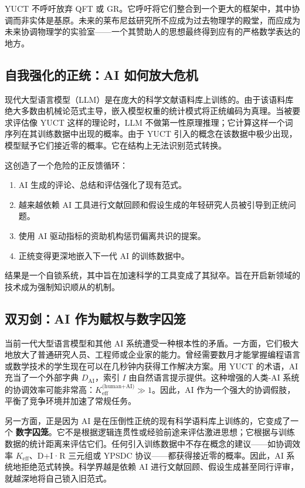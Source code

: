 \documentclass[12pt,a4paper]{article}
\begin{document}
	YUCT 不呼吁放弃 QFT 或 GR。它呼吁将它们整合到一个更大的框架中，其中协调而非实体是基原。未来的莱布尼兹研究所不应成为过去物理学的殿堂，而应成为未来协调物理学的实验室——一个其赞助人的思想最终得到应有的严格数学表达的地方。
	
	\subsection{自我强化的正统：AI 如何放大危机}
	
	现代大型语言模型（LLM）是在庞大的科学文献语料库上训练的。由于该语料库绝大多数由机械论范式主导，嵌入模型权重的统计模式将正统编码为真理。当被要求评估像 YUCT 这样的理论时，LLM 不做第一性原理推理；它计算这样一个词序列在其训练数据中出现的概率。由于 YUCT 引入的概念在该数据中极少出现，模型赋予它们接近零的概率。它在结构上无法识别范式转换。
	
	这创造了一个危险的正反馈循环：
	\begin{enumerate}
		\item AI 生成的评论、总结和评估强化了现有范式。
		\item 越来越依赖 AI 工具进行文献回顾和假设生成的年轻研究人员被引导到正统问题。
		\item 使用 AI 驱动指标的资助机构惩罚偏离共识的提案。
		\item 正统变得更深地嵌入下一代 AI 的训练数据中。
	\end{enumerate}
	结果是一个自锁系统，其中旨在加速科学的工具变成了其狱卒。旨在开启新领域的技术成为强制知识顺从的机制。
	
	\subsection{双刃剑：AI 作为赋权与数字囚笼}
	
	当前一代大型语言模型和其他 AI 系统遭受一种根本性的矛盾。一方面，它们极大地放大了普通研究人员、工程师或企业家的能力。曾经需要数月才能掌握编程语言或数学技术的学生现在可以在几秒钟内获得工作解决方案。用 YUCT 的术语，AI 充当了一个外部字典 \(D_{\text{AI}}\)，索引 \(I\) 由自然语言提示提供。这种增强的人类-AI 系统的协调效率可能非常高：\(K_{\mathrm{eff}}^{\text{(human+AI)}} \gg 1\)。因此，AI 作为一个强大的协调假肢，平衡了竞争环境并加速了常规任务。
	
	另一方面，正是因为 AI 是在压倒性正统的现有科学语料库上训练的，它变成了一个 \textbf{数字囚笼}。它不是根据逻辑连贯性或经验前途来评估激进思想；它根据与训练数据的统计距离来评估它们。任何引入训练数据中不存在概念的建议——如协调效率 \(K_{\mathrm{eff}}\)、D+I·R 三元组或 YPSDC 协议——都获得接近零的概率。因此，AI 系统地拒绝范式转换。科学界越是依赖 AI 进行文献回顾、假设生成甚至同行评审，就越深地将自己锁入旧范式。
	
\end{document}
